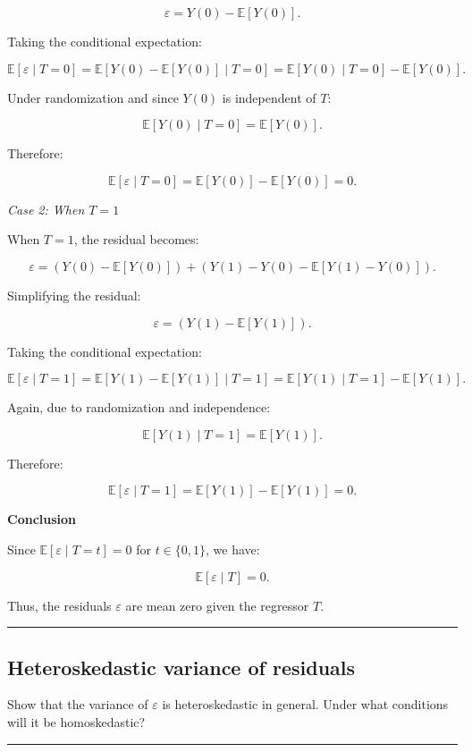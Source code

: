\documentclass{article}
\newenvironment{colorparagraph}[1]{\par\color{#1}}{\par}
\begin{document}
\[
\varepsilon = Y(0) - \mathbb{E}[Y(0)].
\]

Taking the conditional expectation:

\[
\mathbb{E}[\varepsilon \mid T = 0] = \mathbb{E}[Y(0) - \mathbb{E}[Y(0)] \mid T = 0] = \mathbb{E}[Y(0) \mid T = 0] - \mathbb{E}[Y(0)].
\]

Under randomization and since \(Y(0)\) is independent of \(T\):

\[
\mathbb{E}[Y(0) \mid T = 0] = \mathbb{E}[Y(0)].
\]

Therefore:

\[
\mathbb{E}[\varepsilon \mid T = 0] = \mathbb{E}[Y(0)] - \mathbb{E}[Y(0)] = 0.
\]

\textit{Case 2: When \(T = 1\)}

When \(T = 1\), the residual becomes:

\[
\varepsilon = \left( Y(0) - \mathbb{E}[Y(0)] \right) + \left( Y(1) - Y(0) - \mathbb{E}[Y(1) - Y(0)] \right).
\]

Simplifying the residual:

\[
\varepsilon = \left( Y(1) - \mathbb{E}[Y(1)] \right).
\]

Taking the conditional expectation:

\[
\mathbb{E}[\varepsilon \mid T = 1] = \mathbb{E}[Y(1) - \mathbb{E}[Y(1)] \mid T = 1] = \mathbb{E}[Y(1) \mid T = 1] - \mathbb{E}[Y(1)].
\]

Again, due to randomization and independence:

\[
\mathbb{E}[Y(1) \mid T = 1] = \mathbb{E}[Y(1)].
\]

Therefore:

\[
\mathbb{E}[\varepsilon \mid T = 1] = \mathbb{E}[Y(1)] - \mathbb{E}[Y(1)] = 0.
\]

\textbf{Conclusion}

Since \(\mathbb{E}[\varepsilon \mid T = t] = 0\) for \(t \in \{0, 1\}\), we have:

\[
\mathbb{E}[\varepsilon \mid T] = 0.
\]

Thus, the residuals \(\varepsilon\) are mean zero given the regressor \(T\).

\begin{colorparagraph}{questioncolor}
\rule{\textwidth}{0.5pt}

\label{q2b}\subsection{Heteroskedastic variance of residuals}
Show that the variance of \(\varepsilon\) is heteroskedastic in general. Under what conditions will it be homoskedastic?

\rule{\textwidth}{0.5pt}
\end{colorparagraph}
\end{document}
